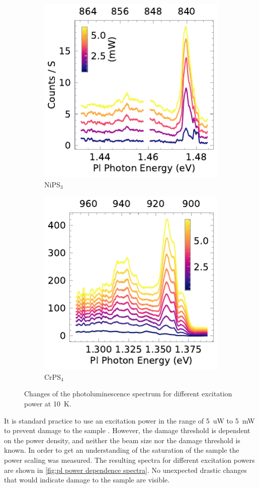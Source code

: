 \documentclass[
	twoside,
	parskip=half,
	a4paper,
]{scrbook}
\begin{document}
\begin{figure}
	\centering
	\begin{subfigure}{2.5in}
		\includegraphics{../figures/2024-04-06 NiPS3 excitation power dependence.pdf}
		\caption{NiPS$_3$}
	\end{subfigure}
	\begin{subfigure}{2.5in}
		\includegraphics{../figures/2023-12-14 CrPS4 excitation power dependence.pdf}
		\caption{CrPS$_4$}
	\end{subfigure}
	\caption{Changes of the photoluminescence spectrum for different excitation power at \SI{10}{K}.}
	\label{fig:pl power dependence spectra}
\end{figure}
It is standard practice to use an excitation power in the range of \SI{5}{uW} to \SI{5}{mW} to prevent damage to the sample \cite{NiPS3_anisotropic, NiPS3_exciton}.
However, the damage threshold is dependent on the power density, and neither the beam size nor the damage threshold is known.
In order to get an understanding of the saturation of the sample the power scaling was measured.
The resulting spectra for different excitation powers are shown in \autoref{fig:pl power dependence spectra}.
No unexpected drastic changes that would indicate damage to the sample are visible.
\end{document}

